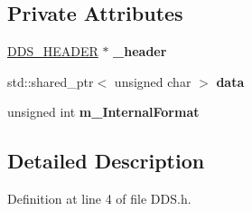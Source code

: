 \subsection*{Private Attributes}
\begin{DoxyCompactItemize}
\item 
\hyperlink{struct_d_d_s___h_e_a_d_e_r}{D\+D\+S\+\_\+\+H\+E\+A\+D\+ER} $\ast$ {\bfseries \+\_\+header}\hypertarget{class_d_d_s_a354ae60bdc35adf0b92e4d320e61fad6}{}\label{class_d_d_s_a354ae60bdc35adf0b92e4d320e61fad6}

\item 
std\+::shared\+\_\+ptr$<$ unsigned char $>$ {\bfseries data}\hypertarget{class_d_d_s_a4c9dc0548401f81bdfd8e799e1c15976}{}\label{class_d_d_s_a4c9dc0548401f81bdfd8e799e1c15976}

\item 
unsigned int {\bfseries m\+\_\+\+Internal\+Format}\hypertarget{class_d_d_s_a82a480e9bed9083c47312a60e7755248}{}\label{class_d_d_s_a82a480e9bed9083c47312a60e7755248}

\end{DoxyCompactItemize}


\subsection{Detailed Description}


Definition at line 4 of file D\+D\+S.\+h.

